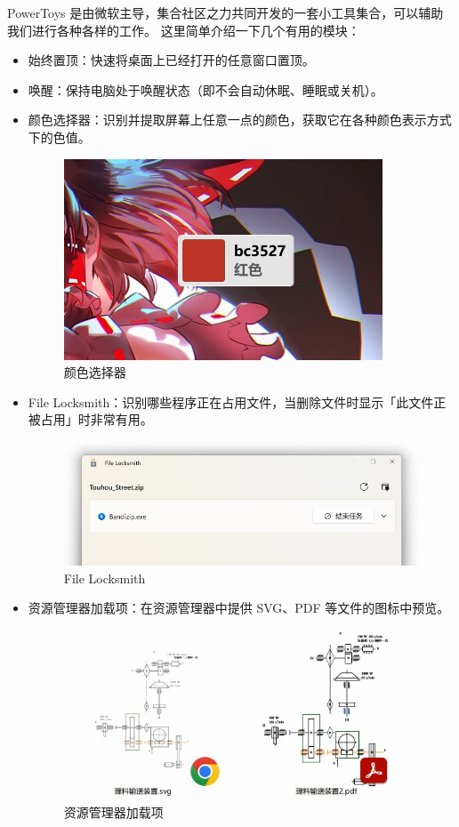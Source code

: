 PowerToys 是由微软主导，集合社区之力共同开发的一套小工具集合，可以辅助我们进行各种各样的工作。
这里简单介绍一下几个有用的模块：

\begin{itemize}
  \item 始终置顶：快速将桌面上已经打开的任意窗口置顶。
  \item 唤醒：保持电脑处于唤醒状态（即不会自动休眠、睡眠或关机）。
  \item 颜色选择器：识别并提取屏幕上任意一点的颜色，获取它在各种颜色表示方式下的色值。
    \begin{figure}[htb!]
      \centering
      \includegraphics[width=.4\textwidth]{assets/Color_Picker.jpg}
      \caption{颜色选择器}
      \label{Color_Picker}
    \end{figure}
  \item File Locksmith：识别哪些程序正在占用文件，当删除文件时显示「此文件正被占用」时非常有用。
    \begin{figure}[htb!]
      \centering
      \includegraphics[width=.7\textwidth]{assets/File_Locksmith.jpg}
      \caption{File Locksmith}
      \label{File_Locksmith}
    \end{figure}
  \item 资源管理器加载项：在资源管理器中提供 SVG、PDF 等文件的图标中预览。
    \begin{figure}[htb!]
      \centering
      \includegraphics[width=.4\textwidth]{assets/Explorer_Addon.jpg}
      \caption{资源管理器加载项}
      \label{Explorer_Addon}
    \end{figure}

\end{itemize}
